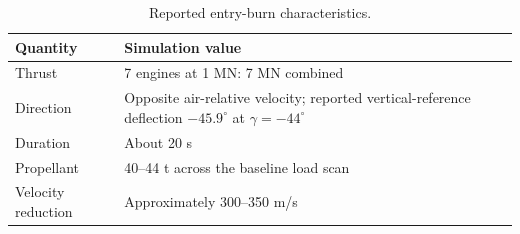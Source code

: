 \begin{table}[htbp]
\caption{Reported entry-burn characteristics.}
\label{tab:src7}
\small
\setlength{\tabcolsep}{3.5pt}
\begin{tabularx}{\linewidth}{@{}p{.22\linewidth}X@{}}
\toprule
Quantity & Simulation value \\
\midrule
Thrust & 7 engines at 1 MN: 7 MN combined \\
Direction & Opposite air-relative velocity; reported vertical-reference deflection $-45.9^\circ$ at $\gamma=-44^\circ$ \\
Duration & About 20 s \\
Propellant & 40--44 t across the baseline load scan \\
Velocity reduction & Approximately 300--350 m/s \\
\bottomrule
\end{tabularx}
\par{}
\end{table}
